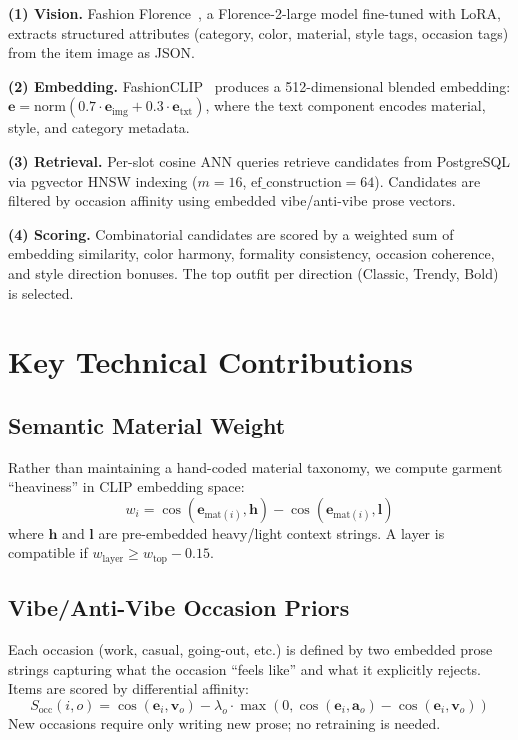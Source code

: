\documentclass[sigconf]{acmart}
\begin{document}
\textbf{(1) Vision.} Fashion Florence~\cite{berlia2026florence}, a
Florence-2-large model fine-tuned with LoRA, extracts structured attributes
(category, color, material, style tags, occasion tags) from the item image
as JSON.

\textbf{(2) Embedding.} FashionCLIP~\cite{chia2022fashionclip} produces a
512-dimensional blended embedding: $\mathbf{e} = \text{norm}(0.7 \cdot
\mathbf{e}_{\text{img}} + 0.3 \cdot \mathbf{e}_{\text{txt}})$, where
the text component encodes material, style, and category metadata.

\textbf{(3) Retrieval.} Per-slot cosine ANN queries retrieve candidates
from PostgreSQL via pgvector HNSW indexing ($m{=}16$,
$\text{ef\_construction}{=}64$).  Candidates are filtered by occasion
affinity using embedded vibe/anti-vibe prose vectors.

\textbf{(4) Scoring.} Combinatorial candidates are scored by a weighted
sum of embedding similarity, color harmony, formality consistency, occasion
coherence, and style direction bonuses.  The top outfit per direction
(Classic, Trendy, Bold) is selected.

\section{Key Technical Contributions}

\subsection{Semantic Material Weight}

Rather than maintaining a hand-coded material taxonomy, we compute garment
``heaviness'' in CLIP embedding space:
\begin{equation}
  w_i = \cos(\mathbf{e}_{\text{mat}(i)}, \mathbf{h}) -
        \cos(\mathbf{e}_{\text{mat}(i)}, \mathbf{l})
\end{equation}
where $\mathbf{h}$ and $\mathbf{l}$ are pre-embedded heavy/light context
strings.  A layer is compatible if $w_{\text{layer}} \geq w_{\text{top}}
- 0.15$.

\subsection{Vibe/Anti-Vibe Occasion Priors}

Each occasion (work, casual, going-out, etc.) is defined by two embedded
prose strings capturing what the occasion ``feels like'' and what it
explicitly rejects.  Items are scored by differential affinity:
\begin{equation}
  S_{\text{occ}}(i, o) = \cos(\mathbf{e}_i, \mathbf{v}_o) -
    \lambda_o \cdot \max(0, \cos(\mathbf{e}_i, \mathbf{a}_o) -
    \cos(\mathbf{e}_i, \mathbf{v}_o))
\end{equation}
New occasions require only writing new prose; no retraining is needed.
\end{document}
